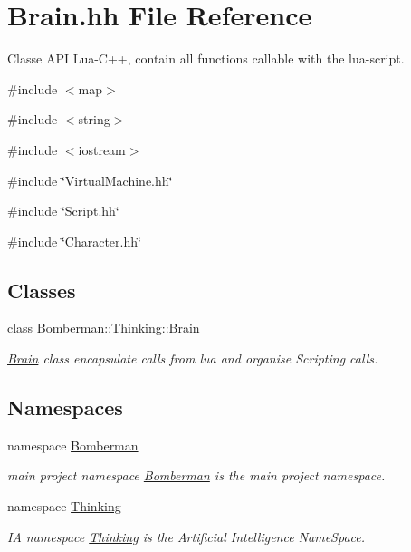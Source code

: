 \hypertarget{Brain_8hh}{
\section{Brain.hh File Reference}
\label{Brain_8hh}
}


Classe API Lua-\/C++, contain all functions callable with the lua-\/script.  


{\ttfamily \#include $<$map$>$}\par
{\ttfamily \#include $<$string$>$}\par
{\ttfamily \#include $<$iostream$>$}\par
{\ttfamily \#include \char`\"{}VirtualMachine.hh\char`\"{}}\par
{\ttfamily \#include \char`\"{}Script.hh\char`\"{}}\par
{\ttfamily \#include \char`\"{}Character.hh\char`\"{}}\par
\subsection*{Classes}
\begin{DoxyCompactItemize}
\item 
class \hyperlink{classBomberman_1_1Thinking_1_1Brain}{Bomberman::Thinking::Brain}
\begin{DoxyCompactList}\small\item\em \hyperlink{classBomberman_1_1Thinking_1_1Brain}{Brain} class encapsulate calls from lua and organise Scripting calls. \end{DoxyCompactList}\end{DoxyCompactItemize}
\subsection*{Namespaces}
\begin{DoxyCompactItemize}
\item 
namespace \hyperlink{namespaceBomberman}{Bomberman}


\begin{DoxyCompactList}\small\item\em main project namespace \hyperlink{namespaceBomberman}{Bomberman} is the main project namespace. \end{DoxyCompactList}

\item 
namespace \hyperlink{namespaceThinking}{Thinking}


\begin{DoxyCompactList}\small\item\em IA namespace \hyperlink{namespaceThinking}{Thinking} is the Artificial Intelligence NameSpace. \end{DoxyCompactList}

\end{DoxyCompactItemize}


